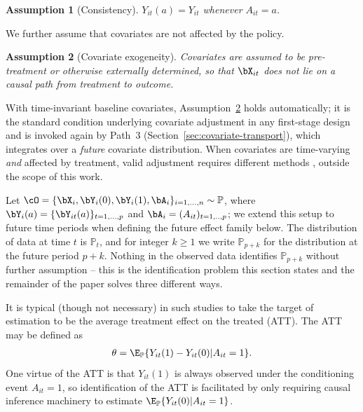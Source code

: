 \documentclass{article}
\newtheorem{assumption}{Assumption}
\renewcommand{\P}{\mathbb{P}}
\begin{document}
\begin{assumption}[Consistency]\label{assump:consistency}
$Y_{it}(a) = Y_{it}$ whenever $A_{it} = a$.
\end{assumption}

We further assume that covariates are not affected by the policy.
\begin{assumption}[Covariate exogeneity]\label{assump:cov-exog}
Covariates are assumed to be pre-treatment or otherwise externally determined, so that $\bX_{it}$ does not lie on a causal path from treatment to outcome.
\end{assumption}

With time-invariant baseline covariates, Assumption~\ref{assump:cov-exog} holds automatically; it is the standard condition underlying covariate adjustment in any first-stage design and is invoked again by Path~3 (Section~\ref{sec:covariate-transport}), which integrates over a \emph{future} covariate distribution. When covariates are time-varying \emph{and} affected by treatment, valid adjustment requires different methods \citep{robinsNewApproachCausal1986}, outside the scope of this work.

Let $\cO = \{\bX_i, \bY_{i}(0), \bY_{i}(1), \bA_{i}\}_{i = 1, ..., n} \sim \P$, where $\bY_i(a) = \{\bY_{it}(a)\}_{t = 1, ..., p}$ and $\bA_i = (A_{it})_{t = 1,.., p}$; we extend this setup to future time periods when defining the future effect family below. The distribution of data at time $t$ is $\P_t$, and for integer $k \geq 1$ we write $\P_{p+k}$ for the distribution at the future period $p+k$. Nothing in the observed data identifies $\P_{p+k}$ without further assumption -- this is the identification problem this section states and the remainder of the paper solves three different ways.

It is typical (though not necessary) in such studies to take the target of estimation to be the average treatment effect on the treated (ATT). The ATT may be defined as
\begin{align*}
    \theta = \E_\P\{Y_{it}(1) - Y_{it}(0) | A_{it} = 1\}.
\end{align*}
One virtue of the ATT is that $Y_{it}(1)$ is always observed under the conditioning event $A_{it} = 1$, so identification of the ATT is facilitated by only requiring causal inference machinery to estimate $\E_\P\{Y_{it}(0) | A_{it} = 1\}$.
\end{document}
